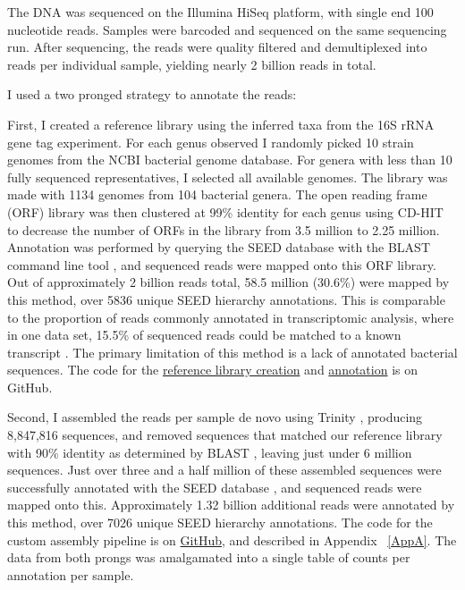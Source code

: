 The DNA was sequenced on the Illumina HiSeq platform, with single end 100 nucleotide reads. Samples were barcoded and sequenced on the same sequencing run. After sequencing, the reads were quality filtered and demultiplexed into reads per individual sample, yielding nearly 2 billion reads in total.

I used a two pronged strategy to annotate the reads:

First, I created a reference library using the inferred taxa from the 16S rRNA gene tag experiment. For each genus observed I randomly picked 10 strain genomes from the NCBI bacterial genome database. For genera with less than 10 fully sequenced representatives, I selected all available genomes. The library was made with 1134 genomes from 104 bacterial genera. The open reading frame (ORF) library was then clustered at 99\% identity for each genus using CD-HIT \cite{li2006cd} to decrease the number of ORFs in the library from 3.5 million to 2.25 million. Annotation was performed by querying the SEED database \cite{overbeek2005subsystems} with the BLAST command line tool \cite{altschul1990basic}, and sequenced reads were mapped onto this ORF library. Out of approximately 2 billion reads total, 58.5 million (30.6\%) were mapped by this method, over 5836 unique SEED hierarchy annotations. This is comparable to the proportion of reads commonly annotated in transcriptomic analysis, where in one data set, 15.5\% of sequenced reads could be matched to a known transcript \cite{celaj2014comparison}. The primary limitation of this method is a lack of annotated bacterial sequences. The code for the \href{https://github.com/ruthgrace/make_functional_mapping_library}{reference library creation} and \href{https://github.com/ruthgrace/mapping_library_annotated_counts}{annotation} is on GitHub.

Second, I assembled the reads per sample de novo using Trinity \cite{haas2013novo}, producing 8,847,816 sequences, and removed sequences that matched our reference library with 90\% identity as determined by BLAST \cite{altschul1990basic}, leaving just under 6 million sequences. Just over three and a half million of these assembled sequences were successfully annotated with the SEED database \cite{overbeek2005subsystems}, and sequenced reads were mapped onto this. Approximately 1.32 billion additional reads were annotated by this method, over 7026 unique SEED hierarchy annotations. The code for the custom assembly pipeline is on \href{https://github.com/ruthgrace/exploring_nafld_assembly}{GitHub}, and described in Appendix ~\ref{AppA}. The data from both prongs was amalgamated into a single table of counts per annotation per sample.

